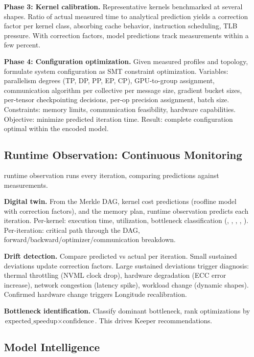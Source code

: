 \textbf{Phase 3: Kernel calibration.}
Representative kernels benchmarked at several shapes.
Ratio of actual measured time to analytical prediction yields a correction factor per kernel class, absorbing cache behavior, instruction scheduling, TLB pressure.
With correction factors, model predictions track measurements within a few percent.

\textbf{Phase 4: Configuration optimization.}
Given measured profiles and topology, formulate system configuration as SMT constraint optimization.
Variables: parallelism degrees (TP, DP, PP, EP, CP), GPU-to-group assignment, communication algorithm per collective per message size, gradient bucket sizes, per-tensor checkpointing decisions, per-op precision assignment, batch size.
Constraints: memory limits, communication feasibility, hardware capabilities.
Objective: minimize predicted iteration time.
Result: complete configuration optimal within the encoded model.

\subsection{Runtime Observation: Continuous Monitoring}

runtime observation runs every iteration, comparing predictions against measurements.

\textbf{Digital twin.}
From the Merkle DAG, kernel cost predictions (roofline model with correction factors), and the memory plan, runtime observation predicts each iteration.
Per-kernel: execution time, utilization, bottleneck classification (, , , , ).
Per-iteration: critical path through the DAG, forward/backward/optimizer/communication breakdown.

\textbf{Drift detection.}
Compare predicted vs actual per iteration.
Small sustained deviations update correction factors.
Large sustained deviations trigger diagnosis: thermal throttling (NVML clock drop), hardware degradation (ECC error increase), network congestion (latency spike), workload change (dynamic shapes).
Confirmed hardware change triggers Longitude recalibration.

\textbf{Bottleneck identification.}
Classify dominant bottleneck, rank optimizations by $\text{expected\_speedup} \times \text{confidence}$.
This drives Keeper recommendations.

\subsection{Model Intelligence}

